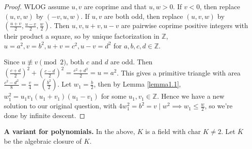 \documentclass{article}
\theoremstyle{definition}
\begin{document}
\begin{proof}
    WLOG assume $u,v$ are coprime and that $u,w > 0$. If $v<0$, then replace $(u,v,w)$ by $(-v,u,w)$. If $u,v$ are both odd, then replace $(u,v,w)$ by $\left(\frac{u+v}{2},\frac{u-v}{2},\frac{w}{2}\right)$. Then $u,v,u+v,u-v$ are pairwise coprime positive integers with their product a square, so by unique factorization in $\mathbb{Z}$, $u=a^2, v = b^2, u+v = c^2, u-v = d^2$ for $a,b,c,d \in \mathbb{Z}$. 
    \vspace{1mm}
     
    Since $u \not\equiv v \pmod{2}$, both $c$ and $d$ are odd. Then $\left(\frac{c+d}{2}\right)^2 + \left(\frac{c-d}{2}\right)^2 = \frac{c^2+d^2}{2} = u = a^2$. This gives a primitive triangle with area $\frac{c^2-d^2}{8} = \frac{v}{4} = \left(\frac{b^2}{2}\right)$. Let $w_1 = \frac{b}{2}$, then by Lemma \ref{lemma1.1}, $w_1^2 = u_1v_1(u_1+v_1)(u_1-v_1)$ for some $u_1, v_1 \in \mathbb{Z}$. Hence we have a new solution to our original question, with $4w_1^2 = b^2 = v \mid w^2 \implies w_1 \le \frac{w}{2}$, so we're done by infinite descent.
\end{proof}
\vspace{1mm}
 
\textbf{A variant for polynomials.} In the above, $K$ is a field with $\text{char }K \neq 2$. Let $\overline{K}$ be the algebraic closure of $K$.
\end{document}
